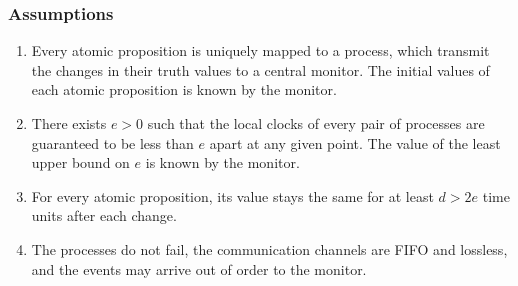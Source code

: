 \documentclass[envcountsame, runningheads]{llncs}
\newcommand{\answer}[1]{{\color{white}#1}}
\newcommand{\bluenote}[2][]{{\todo[color=cyan!80,size=\footnotesize,#1]{\normalcolor\normalfont#2}}}
\newcommand{\rednote}[2][]{{\todo[color=magenta!80,size=\footnotesize,#1]{\normalcolor\normalfont#2}}}
\newcommand{\?}{\text{?}}
\begin{document}
	\subsubsection*{Assumptions}
	\begin{enumerate}
		\item Every atomic proposition is uniquely mapped to a process, which transmit the changes in their truth values to a central monitor. The initial values of each atomic proposition is known by the monitor.
			\item There exists $e > 0$ such that the local clocks of every pair of processes are guaranteed to be less than $e$ apart at any given point. The value of the least upper bound on $e$ is known by the monitor. 
		\item For every atomic proposition, its value stays the same for at least $d > 2e$ time units after each change. %
		\item The processes do not fail, the communication channels are FIFO and lossless, and the events may arrive out of order to the monitor.
	\end{enumerate}
	
\end{document}
